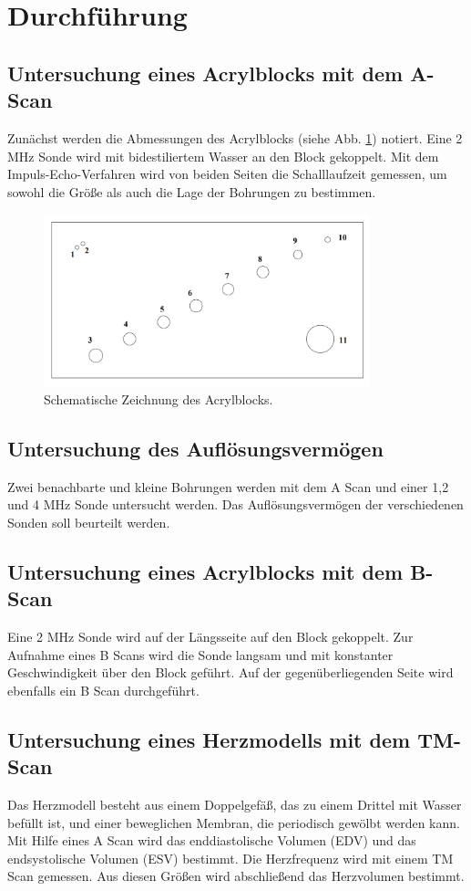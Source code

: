 \section{Durchführung}
\label{sec:Durchführung}

\subsection{Untersuchung eines Acrylblocks mit dem A-Scan}

Zunächst werden die Abmessungen des Acrylblocks (siehe Abb. \ref{fig:Block}) notiert.
Eine 2 MHz Sonde wird mit bidestiliertem Wasser an den Block gekoppelt.
Mit dem Impuls-Echo-Verfahren wird von beiden Seiten die Schalllaufzeit gemessen,
um sowohl die Größe als auch die Lage der Bohrungen zu bestimmen.
\begin{figure}
  \centering
  \includegraphics[height=5cm]{data/Block.png}
  \caption{Schematische Zeichnung des Acrylblocks. \cite{US2}}
  \label{fig:Block}
\end{figure}

\subsection{Untersuchung des Auflösungsvermögen}

Zwei benachbarte und kleine Bohrungen werden mit dem A Scan und einer 1,2 und 4 MHz Sonde untersucht werden.
Das Auflösungsvermögen der verschiedenen Sonden soll beurteilt werden.

\subsection{Untersuchung eines Acrylblocks mit dem B-Scan}

Eine 2 MHz Sonde wird auf der Längsseite auf den Block gekoppelt.
Zur Aufnahme eines B Scans wird die Sonde langsam und mit konstanter Geschwindigkeit über den Block geführt.
Auf der gegenüberliegenden Seite wird ebenfalls ein B Scan durchgeführt.

\subsection{Untersuchung eines Herzmodells mit dem TM-Scan}

Das Herzmodell besteht aus einem Doppelgefäß, das zu einem Drittel mit Wasser befüllt ist,
und einer beweglichen Membran, die periodisch gewölbt werden kann.
Mit Hilfe eines A Scan wird das enddiastolische Volumen (EDV) und das endsystolische Volumen (ESV) bestimmt.
Die Herzfrequenz wird mit einem TM Scan gemessen.
Aus diesen Größen wird abschließend das Herzvolumen bestimmt.
